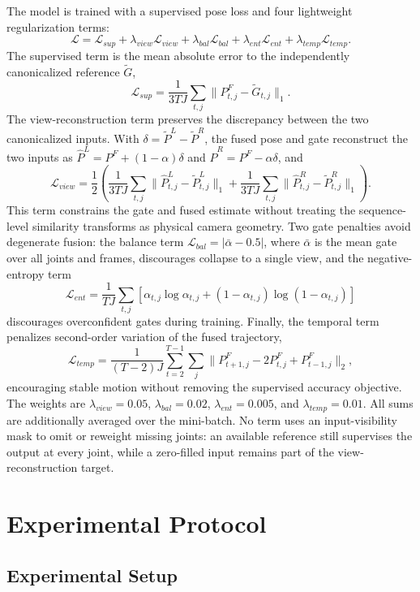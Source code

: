 \documentclass[preprint,12pt]{elsarticle}
\begin{document}
The model is trained with a supervised pose loss and four lightweight regularization terms:
\[
\mathcal{L}
=
\mathcal{L}_{sup}
+
\lambda_{view}\mathcal{L}_{view}
+
\lambda_{bal}\mathcal{L}_{bal}
+
\lambda_{ent}\mathcal{L}_{ent}
+
\lambda_{temp}\mathcal{L}_{temp}.
\]
The supervised term is the mean absolute error to the independently canonicalized reference \(\tilde{G}\),
\[
\mathcal{L}_{sup}=\frac{1}{3TJ}\sum_{t,j}\|P^{F}_{t,j}-\tilde{G}_{t,j}\|_{1}.
\]
The view-reconstruction term preserves the discrepancy between the two canonicalized inputs. With \(\delta=\tilde{P}^{L}-\tilde{P}^{R}\), the fused pose and gate reconstruct the two inputs as \(\hat{P}^{L}=P^{F}+(1-\alpha)\delta\) and \(\hat{P}^{R}=P^{F}-\alpha\delta\), and
\[
\mathcal{L}_{view}=\frac{1}{2}\left(\frac{1}{3TJ}\sum_{t,j}\|\hat{P}^{L}_{t,j}-\tilde{P}^{L}_{t,j}\|_{1}
+\frac{1}{3TJ}\sum_{t,j}\|\hat{P}^{R}_{t,j}-\tilde{P}^{R}_{t,j}\|_{1}\right).
\]
This term constrains the gate and fused estimate without treating the sequence-level similarity transforms as physical camera geometry. Two gate penalties avoid degenerate fusion: the balance term \(\mathcal{L}_{bal}=|\bar{\alpha}-0.5|\), where \(\bar{\alpha}\) is the mean gate over all joints and frames, discourages collapse to a single view, and the negative-entropy term
\[
\mathcal{L}_{ent}=\frac{1}{TJ}\sum_{t,j}\left[\alpha_{t,j}\log\alpha_{t,j}+(1-\alpha_{t,j})\log(1-\alpha_{t,j})\right]
\]
discourages overconfident gates during training. Finally, the temporal term penalizes second-order variation of the fused trajectory,
\[
\mathcal{L}_{temp}=\frac{1}{(T-2)J}\sum_{t=2}^{T-1}\sum_{j}\|P^{F}_{t+1,j}-2P^{F}_{t,j}+P^{F}_{t-1,j}\|_{2},
\]
encouraging stable motion without removing the supervised accuracy objective. The weights are \(\lambda_{view}=0.05\), \(\lambda_{bal}=0.02\), \(\lambda_{ent}=0.005\), and \(\lambda_{temp}=0.01\). All sums are additionally averaged over the mini-batch. No term uses an input-visibility mask to omit or reweight missing joints: an available reference still supervises the output at every joint, while a zero-filled input remains part of the view-reconstruction target.

\section{Experimental Protocol}

\subsection{Experimental Setup}
\end{document}
